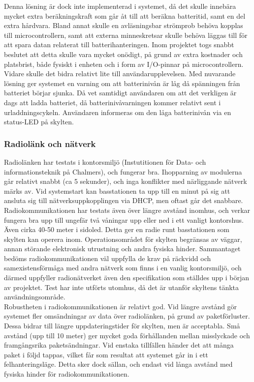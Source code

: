\documentclass[a4paper,11pt]{article}
\begin{document}
Denna lösning är dock inte implementerad i systemet, då det skulle innebära mycket extra beräkningskraft som går åt till att beräkna batteritid, samt en del extra hårdvara. Bland annat skulle en avläsningsbar strömprob behöva kopplas till microcontrollern, samt att externa minneskretsar skulle behöva läggas till för att spara datan relaterat till batterihanteringen. Inom projektet togs snabbt beslutet att detta skulle vara mycket onödigt, på grund av extra kostnader och platsbrist, både fysiskt i enheten och i form av I/O-pinnar på microcontrollern. Vidare skulle det bidra relativt lite till användarupplevelsen. Med nuvarande lösning ger systemet en varning om att batterinivån är låg då spänningen från batteriet börjar sjunka. Då vet samtidigt användaren om att det verkligen är dags att ladda batteriet, då batterinivåvarningen kommer relativt sent i urladdningscykeln. Användaren informeras om den låga batterinivån via en status-LED på skylten. \\

\subsubsection{Radiolänk och nätverk}
Radiolänken har testats i kontorsmiljö (Instutitionen för Data- och informationsteknik på Chalmers), och fungerar bra. Ihopparning av modulerna går relativt snabbt (ca 5 sekunder), och inga konflikter med närliggande nätverk märks av. Vid systemstart kan basstationen ta upp till en minut på sig att ansluta sig till nätverksuppkopplingen via DHCP, men oftast går det snabbare. \\

Radiokommunikationen har testats även över längre avstånd inomhus, och verkar fungera bra upp till ungefär två våningar upp eller ned i ett vanligt kontorshus. Även cirka 40-50 meter i sidoled. Detta ger en radie runt basstationen som skylten kan operera inom. Operationsområdet för skylten begränsas av väggar, annan störande elektronisk utrustning och andra fysiska hinder. Sammantaget bedöms radiokommunikationen väl uppfylla de krav på räckvidd och samexistensförmåga med andra nätverk som finns i en vanlig kontorsmiljö, och därmed uppfyller radionätverket även den specifikation som ställdes upp i början av projektet. Test har inte utförts utomhus, då det är utanför skyltens tänkta användningsområde. \\

Robustheten i radiokommunikationen är relativt god. Vid längre avstånd gör systemet fler omsändningar av data över radiolänken, på grund av paketförluster. Dessa bidrar till längre uppdateringstider för skylten, men är acceptabla. Små avstånd (upp till 10 meter) ger mycket goda förhållanden mellan misslyckade och framgångsrika paketsändningar. Vid enstaka tillfällen händer det att många paket i följd tappas, vilket får som resultat att systemet går in i ett felhanteringsläge. Detta sker dock sällan, och endast vid långa avstånd med fysiska hinder för radiokommunikationen.
\end{document}
